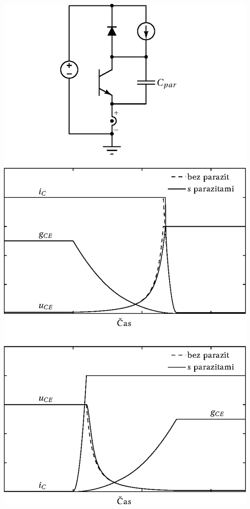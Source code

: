 \documentclass[oneside]{article}
\begin{document}
{\hspace{36pt}
\includegraphics[height=.85\textheight]{obr/Cpar_bez_prekmitu}
\par }


\end{document}
